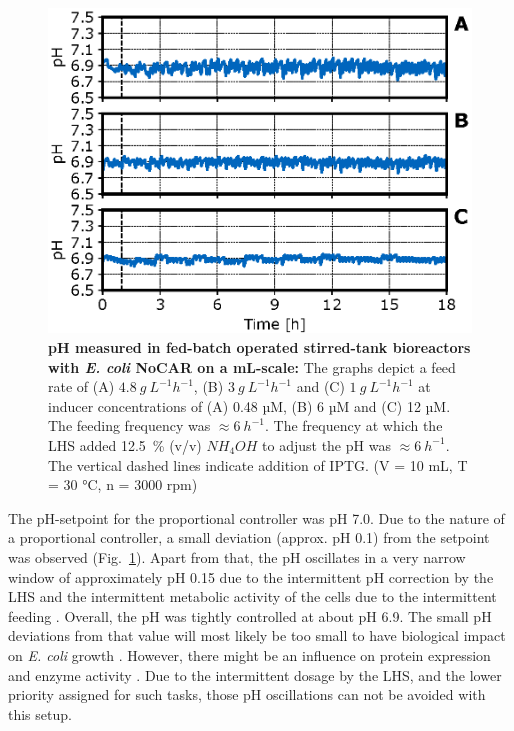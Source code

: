 \documentclass[sn-standardnature]{sn-jnl}%
\theoremstyle{thmstyleone}%
\theoremstyle{thmstyletwo}%
\theoremstyle{thmstylethree}%
\begin{document}
\begin{figure}[H]
    \centering
    \includegraphics[width=1.0\textwidth]{figures/Fig4.eps}
    \caption{
        \textbf{pH measured in fed-batch operated stirred-tank bioreactors with \textit{E. coli} NoCAR on a mL-scale:}
        The graphs depict a feed rate of (A) $4.8\ g\ L^{-1} h^{-1}$, (B) $3\ g\ L^{-1} h^{-1}$ and (C) $1\ g\ L^{-1} h^{-1}$ at inducer concentrations of (A) 0.48 µM, (B) 6 µM and (C) 12 µM.
        The feeding frequency was $\approx 6\ h^{-1}$.
        The frequency at which the LHS added 12.5~\% (v/v) $NH_{4}OH$ to adjust the pH was $\approx 6\ h^{-1}$.
        The vertical dashed lines indicate addition of IPTG.
        (V = 10 mL, T = 30 °C, n = 3000 rpm)
    }
    \label{fig_pHoverview}
\end{figure}

The pH-setpoint for the proportional controller was pH 7.0.
Due to the nature of a proportional controller, a small deviation (approx. pH 0.1) from the setpoint was observed (Fig.~\ref{fig_pHoverview}).
Apart from that, the pH oscillates in a very narrow window of approximately pH 0.15 due to the intermittent pH correction by the LHS and the intermittent metabolic activity of the cells due to the intermittent feeding \cite{kim2004high}.
Overall, the pH was tightly controlled at about pH 6.9.
The small pH deviations from that value will most likely be too small to have biological impact on \textit{E. coli} growth \cite{presser1997modelling,gale1942effect}.
However, there might be an influence on protein expression and enzyme activity \cite{cui2009influence,strandberg1991factors}.
Due to the intermittent dosage by the LHS, and the lower priority assigned for such tasks, those pH oscillations can not be avoided with this setup.
\end{document}

